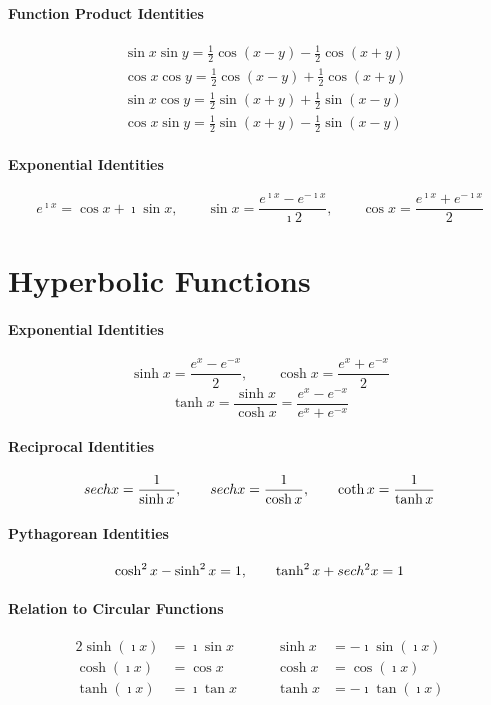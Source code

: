 \paragraph{Function Product Identities}
\begin{align*}
  &\sin x \sin y = \frac{1}{2} \cos(x-y) - \frac{1}{2} \cos(x+y) \\
  &\cos x \cos y = \frac{1}{2} \cos(x-y) + \frac{1}{2} \cos(x+y) \\
  &\sin x \cos y = \frac{1}{2} \sin(x+y) + \frac{1}{2} \sin(x-y) \\
  &\cos x \sin y = \frac{1}{2} \sin(x+y) - \frac{1}{2} \sin(x-y) 
\end{align*}

\paragraph{Exponential Identities}
\[      
e^{\imath x} = \cos x + \imath \sin x, \qquad
\sin x = \frac{e^{\imath x} - e^{-\imath x}}{\imath 2}, \qquad
\cos x = \frac{e^{\imath x} + e^{-\imath x}}{2} 
\]

\section{Hyperbolic Functions}

\paragraph{Exponential Identities}
\[ \sinh x = \frac{e^x - e^{-x}}{2}, \qquad \cosh x = \frac{e^x + e^{-x}}{2}\]
\[ \tanh x = \frac{\sinh x}{\cosh x} = \frac{e^x - e^{-x}}{e^x + e^{-x}} \]

\paragraph{Reciprocal Identities}
\[ sech x = \frac{1}{\sinh x}, \qquad sech x = \frac{1}{\cosh x}, \qquad
\coth x = \frac{1}{\tanh x} \]

\paragraph{Pythagorean Identities}
\[ \cosh^2 x - \sinh^2 x = 1, \qquad \tanh^2 x + sech^2 x = 1 \]

\paragraph{Relation to Circular Functions}
\begin{alignat*}{2}
  \sinh(\imath x) &= \imath \sin x &\qquad \sinh x &= -\imath \sin(\imath x)
  \\
  \cosh(\imath x) &= \cos x &\qquad \cosh x &= \cos(\imath x)
  \\
  \tanh(\imath x) &= \imath \tan x &\qquad \tanh x &= - \imath \tan(\imath x)
\end{alignat*}

